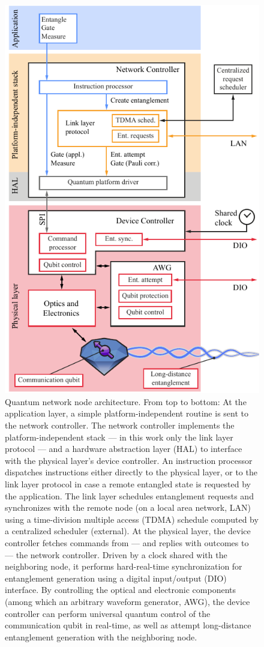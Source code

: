 \begin{figure}
    \centering
    \includegraphics[width=0.6\linewidth]{figures/netnode.pdf}
    \caption{
        Quantum network node architecture. From top to bottom: At the application layer, a simple
        platform-independent routine is sent to the network controller. The network controller
        implements the platform-independent stack --- in this work only the link layer protocol ---
        and a hardware abstraction layer (HAL) to interface with the physical layer's device
        controller. An instruction processor dispatches instructions either directly to the physical
        layer, or to the link layer protocol in case a remote entangled state is requested by the
        application. The link layer schedules entanglement requests and synchronizes with the remote
        node (on a local area network, LAN) using a time-division multiple access (TDMA) schedule
        computed by a centralized scheduler (external). At the physical layer, the device controller
        fetches commands from --- and replies with outcomes to --- the network controller. Driven by
        a clock shared with the neighboring node, it performs hard-real-time synchronization for
        entanglement generation using a digital input/output (DIO) interface. By controlling the
        optical and electronic components (among which an arbitrary waveform generator, AWG), the
        device controller can perform universal quantum control of the communication qubit in
        real-time, as well as attempt long-distance entanglement generation with the neighboring
        node.
    }
    \label{fig:netnode}
\end{figure}

